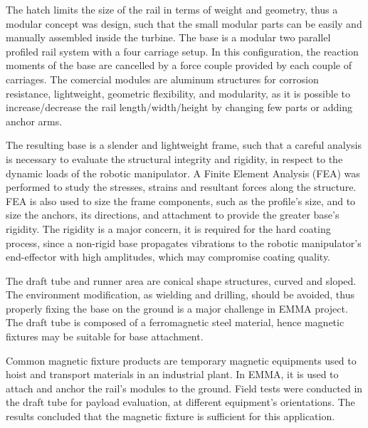 The hatch limits the size of the rail in terms of weight and geometry, thus a
modular concept was design, such that the small modular parts can be easily and
manually assembled inside the turbine. The base is a modular two parallel
profiled rail system %
with a four carriage setup. In this configuration, the reaction moments of the
base are cancelled by a force couple provided by each couple of carriages. The
comercial modules are aluminum structures for corrosion resistance,
lightweight, geometric flexibility, and modularity, as it is possible to
increase/decrease the rail length/width/height by changing few parts or adding
anchor arms. %

The resulting base is a slender and lightweight frame, such that a careful
analysis is necessary to evaluate the structural integrity and rigidity, in
respect to the dynamic loads of the robotic manipulator. A Finite Element
Analysis (FEA) was performed to study the stresses, strains and resultant forces
along the structure. FEA is also used to size the frame components, such as
the profile's size, and to size the anchors, its directions, and attachment to
provide the greater base's rigidity. The rigidity is a major concern, it is
required for the hard coating process, since a non-rigid base propagates
vibrations to the robotic manipulator's end-effector with high amplitudes, which
may compromise coating quality.

The draft tube and runner area are conical shape structures, curved and
sloped. The environment modification, as wielding and drilling, should be
avoided, thus properly fixing the base on the ground is a major challenge in
EMMA project. The draft tube is composed of a ferromagnetic steel material,
hence magnetic fixtures may be suitable for base attachment. 

Common magnetic fixture products are temporary magnetic equipments used to hoist
and transport materials in an industrial plant. In EMMA, it is used to attach
and anchor the rail's modules to the ground. Field tests were conducted in the
draft tube for payload evaluation, at different equipment's orientations. The
results concluded that the magnetic fixture is sufficient for this application.

